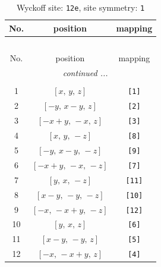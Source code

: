 \documentclass[fleqn,8pt]{jsarticle}
\begin{document}
\begin{longtable}{ccc}
\caption{Wyckoff site: {\tt 12e}, site symmetry: {\tt 1}}
 \\
 \hline \hline
No. & position & mapping \\ \hline \endfirsthead

\multicolumn{2}{l}{\tablename\ \thetable{}} \\
 \hline \hline
No. & position & mapping \\ \hline \endhead

 \hline \hline
\multicolumn{2}{r}{\footnotesize\it continued ...} \\ \endfoot

 \hline \hline
\multicolumn{2}{r}{} \\ \endlastfoot

1 & $\left[ x,\, y,\, z \right]$ & {\tt [1]} \\ \hline
2 & $\left[ - y,\, x - y,\, z \right]$ & {\tt [2]} \\ \hline
3 & $\left[ - x + y,\, - x,\, z \right]$ & {\tt [3]} \\ \hline
4 & $\left[ x,\, y,\, - z \right]$ & {\tt [8]} \\ \hline
5 & $\left[ - y,\, x - y,\, - z \right]$ & {\tt [9]} \\ \hline
6 & $\left[ - x + y,\, - x,\, - z \right]$ & {\tt [7]} \\ \hline
7 & $\left[ y,\, x,\, - z \right]$ & {\tt [11]} \\ \hline
8 & $\left[ x - y,\, - y,\, - z \right]$ & {\tt [10]} \\ \hline
9 & $\left[ - x,\, - x + y,\, - z \right]$ & {\tt [12]} \\ \hline
10 & $\left[ y,\, x,\, z \right]$ & {\tt [6]} \\ \hline
11 & $\left[ x - y,\, - y,\, z \right]$ & {\tt [5]} \\ \hline
12 & $\left[ - x,\, - x + y,\, z \right]$ & {\tt [4]} \\
\end{longtable}
\end{document}

